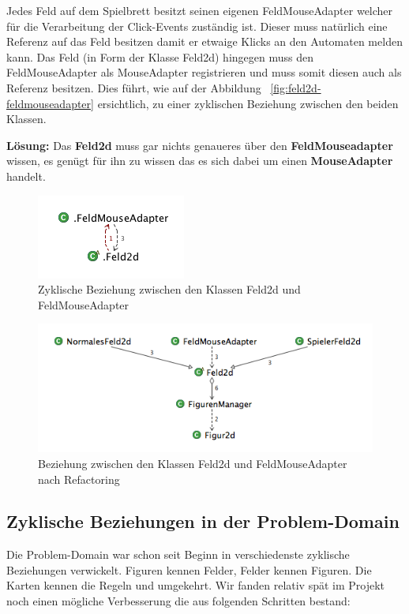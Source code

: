 \documentclass[12pt,halfparskip]{scrartcl}
\begin{document}
Jedes Feld auf dem Spielbrett besitzt seinen eigenen FeldMouseAdapter welcher für die Verarbeitung der Click-Events zuständig ist. Dieser muss natürlich eine Referenz auf das Feld besitzen damit er etwaige Klicks an den Automaten melden kann. Das Feld (in Form der Klasse Feld2d) hingegen muss den FeldMouseAdapter als MouseAdapter registrieren und muss somit diesen auch als Referenz besitzen. Dies führt, wie auf der Abbildung ~\vref{fig:feld2d-feldmouseadapter} ersichtlich, zu einer zyklischen Beziehung zwischen den beiden Klassen.

\textbf{Lösung:} Das \textbf{Feld2d} muss gar nichts genaueres über den \textbf{FeldMouseadapter} wissen, es genügt für ihn zu wissen das es sich dabei um einen \textbf{MouseAdapter} handelt.

\begin{figure}[H]
	\centering
	\includegraphics[width=0.3 \textwidth]{../design/probleme/feld2d-feldmouseadapter}
	\caption{Zyklische Beziehung zwischen den Klassen Feld2d und FeldMouseAdapter}
	\label{fig:feld2d-feldmouseadapter}
\end{figure}

\begin{figure}[H]
	\centering
	\includegraphics[width=0.8 \textwidth]{../design/probleme/feld2d-feldmouseadapter-nachher}
	\caption{Beziehung zwischen den Klassen Feld2d und FeldMouseAdapter nach Refactoring}
	\label{fig:feld2d-feldmouseadapter-nachher}
\end{figure}


\subsection{Zyklische Beziehungen in der Problem-Domain}
Die Problem-Domain war schon seit Beginn in verschiedenste zyklische Beziehungen verwickelt. Figuren kennen Felder, Felder kennen Figuren. Die Karten kennen die Regeln und umgekehrt. Wir fanden relativ spät im Projekt noch einen mögliche Verbesserung die aus folgenden Schritten bestand:
\end{document}
